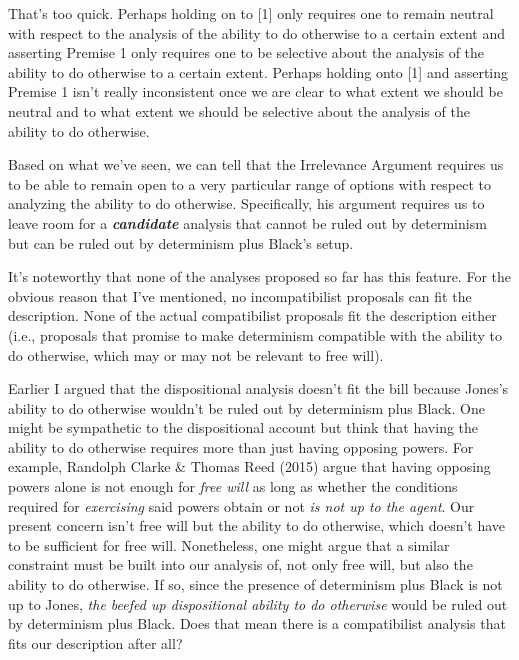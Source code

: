 \documentclass[a4paper,12pt]{article}
\begin{document}
That's too quick. Perhaps holding on to [1] only requires one to remain neutral with respect to the analysis of the ability to do otherwise to a certain extent and asserting Premise 1 only requires one to be selective about the analysis of the ability to do otherwise to a certain extent. Perhaps holding onto [1] and asserting Premise 1 isn't really inconsistent once we are clear to what extent we should be neutral and to what extent we should be selective about the analysis of the ability to do otherwise.

Based on what we've seen, we can tell that the Irrelevance Argument requires us to be able to remain open to a very particular range of options with respect to analyzing the ability to do otherwise. Specifically, his argument requires us to leave room for a \textbf{\emph{candidate}} analysis that cannot be ruled out by determinism but can be ruled out by determinism plus Black's setup.

It's noteworthy that none of the analyses proposed so far has this feature. For the obvious reason that I've mentioned, no incompatibilist proposals can fit the description. None of the actual compatibilist proposals fit the description either (i.e., proposals that promise to make determinism compatible with the ability to do otherwise, which may or may not be relevant to free will).

Earlier I argued that the dispositional analysis doesn't fit the bill because Jones's ability to do otherwise wouldn't be ruled out by determinism plus Black. One might be sympathetic to the dispositional account but think that having the ability to do otherwise requires more than just having opposing powers. For example, Randolph Clarke \& Thomas Reed (2015) argue that having opposing powers alone is not enough for \emph{free will} as long as whether the conditions required for \emph{exercising} said powers obtain or not \emph{is not up to the agent}. Our present concern isn't free will but the ability to do otherwise, which doesn't have to be sufficient for free will. Nonetheless, one might argue that a similar constraint must be built into our analysis of, not only free will, but also the ability to do otherwise. If so, since the presence of determinism plus Black is not up to Jones, \emph{the beefed up dispositional ability to do otherwise} would be ruled out by determinism plus Black. Does that mean there is a compatibilist analysis that fits our description after all?
\end{document}
